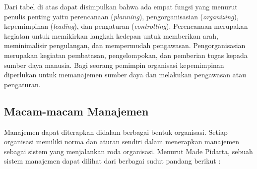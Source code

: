 Dari tabel di atas dapat disimpulkan bahwa ada empat fungsi yang menurut penulis penting yaitu perencanaan (\emph{planning}), pengorganisasian (\emph{organizing}), kepemimpinan (\emph{leading}), dan pengaturan (\emph{controlling}). Perencanaan merupakan kegiatan untuk memikirkan langkah kedepan untuk memberikan arah, meminimalisir pengulangan, dan mempermudah pengawasan. Pengorganisasian merupakan kegiatan pembatasan, pengelompokan, dan pemberian tugas kepada sumber daya manusia. Bagi seorang pemimpin organisasi kepemimpinan diperlukan untuk memanajemen sumber daya dan melakukan pengawasan atau pengaturan.

\subsection{Macam-macam Manajemen}

Manajemen dapat diterapkan didalam berbagai bentuk organisasi. Setiap organisasi memiliki norma dan aturan sendiri dalam menerapkan manajemen sebagai sistem yang menjalankan roda organisasi. Menurut Made Pidarta, sebuah sistem manajemen dapat dilihat dari berbagai sudut pandang berikut \cite{athhoillah} :

